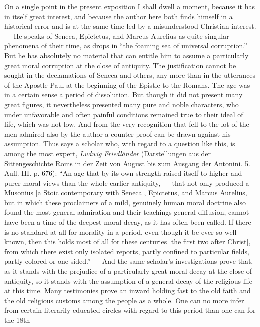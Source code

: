 \documentclass[12pt,a4paper,openany]{book}
\newcommand{\opage}[1]{\marginnote{\footnotesize\textit{[#1]}}}
\begin{document}
On a single point in the present exposition I shall
dwell a moment, because it has in itself great interest,
and because the author here both finds himself in a historical
error and is at the same time led by a misunderstood Christian
interest. --- He speaks of Seneca, Epictetus, and Marcus Aurelius
as quite singular phenomena of their time, as
drops in ``the foaming sea of universal corruption.'' But
he has absolutely no material that can entitle him to
assume a particularly great moral corruption at the close of antiquity.
The justification cannot be sought in the declamations of Seneca and others, any more than
in the utterances of the Apostle Paul
at the beginning of the Epistle to the Romans. The age was in a certain sense
a period of dissolution. But though it did not present many
great figures, it nevertheless presented many pure and noble
characters, who under unfavorable and often painful conditions
remained true to their ideal of life, which was not low. And from the very
recognition that fell to the lot of the men admired also by the author
a counter-proof can be drawn against his
assumption. Thus says a scholar who, with regard to a
question like this, is among the most expert, \emph{Ludwig}
\opage{163}\emph{Friedländer} (Darstellungen aus der Sittengeschichte Roms in
der Zeit von August bis zum Ausgang der Antonini. 5. Aufl.
III. p. 676): ``An age that by its own strength raised itself to
higher and purer moral views than the whole earlier
antiquity, --- that not only produced a Musonius [a Stoic contemporary with
Seneca], Epictetus, and Marcus Aurelius, but
in which these proclaimers of a mild, genuinely human
moral doctrine also found the most general admiration and
their teachings general diffusion, cannot have been
a time of the deepest moral decay, as it
has often been called. If there is no standard at all for
morality in a period, even though it be ever so well known, then this holds most of all
for these centuries [the first two after Christ], from which there
exist only isolated reports, partly confined to particular fields,
partly colored or one-sided.'' --- And the same
scholar's investigations prove that, as it stands
with the prejudice of a particularly great moral decay at
the close of antiquity, so it stands with the assumption
of a general decay of the religious life at this time.
Many testimonies prove an inward holding fast to the
old faith and the old religious customs among the people as a
whole. One can no more infer from certain literarily educated circles with regard to this period than one can for the 18th
\end{document}
